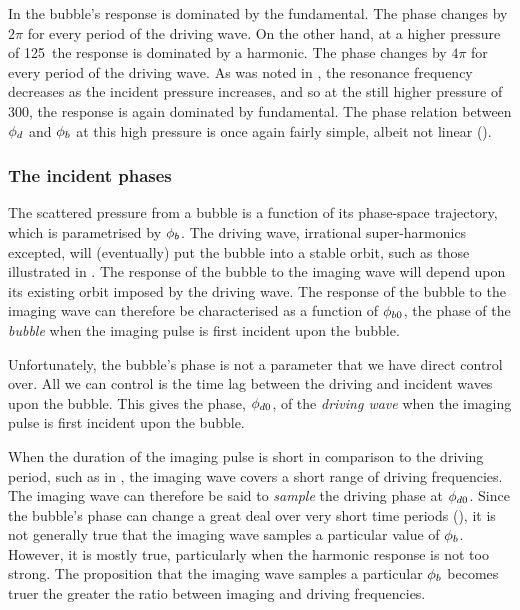 In  the bubble's response is dominated by the fundamental.
The phase changes by $2\pi$ for every period of the driving wave.
On the other hand, at a higher pressure of \unit{125}\kilo\pascal\ the response is dominated by a harmonic. %
The phase changes by $4\pi$ for every period of the driving wave.
As was noted in ,
the resonance frequency decreases as the incident pressure increases,
and so at the still higher pressure of  \unit{300}\kilo\pascal, the response is again dominated by fundamental.
The phase relation between ${\phi_d}$ and ${\phi_b}$ at this high pressure is once again fairly simple, albeit not linear ().

\subsubsection{The incident phases}\label{sec:driving_phase}
The scattered pressure from a bubble is a function of its phase-space trajectory,
which is parametrised by  ${\phi_b}$.
The driving wave, irrational super-harmonics excepted,
will (eventually) put the bubble into a stable orbit, such as those illustrated in .
The response of the bubble to the imaging wave will depend upon its existing orbit 
imposed by the driving wave.
The response of the bubble to the imaging wave can therefore be characterised as a function of  ${\phi_{b0}}$,
the phase of the {\em bubble} when the imaging pulse is first incident upon the bubble.

Unfortunately, the bubble's phase is not a parameter that we have direct control over.
All we can control is the time lag between the driving and incident waves upon the bubble.
This gives the phase, ${\phi_{d0}}$, of the {\em driving wave} when the imaging pulse is first incident upon the bubble.

When the duration of the imaging pulse is short in comparison to the driving period,
such as in ,
the imaging wave covers a short range of driving frequencies.
The imaging wave can therefore be said to {\em sample} the driving phase at ${\phi_{d0}}$.
Since the bubble's phase can change a great deal over very short time periods (),
it is not generally true that the imaging wave samples a particular value of ${\phi_b}$.
However, it is mostly true, particularly when the harmonic response is not too strong.
The proposition that the imaging wave samples a particular ${\phi_b}$ becomes  truer the greater the ratio between imaging and driving frequencies.

